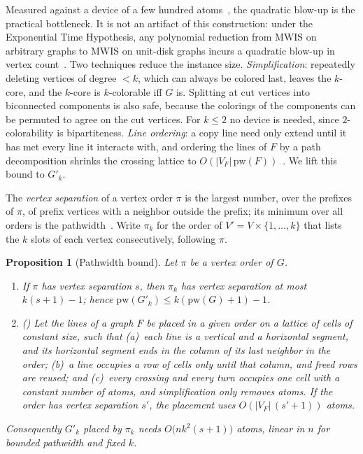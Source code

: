 \documentclass[a4paper,fleqn]{cas-sc}
\newtheorem{proposition}[theorem]{Proposition}
\begin{document}
Measured against a device of a few hundred atoms~\cite{Wurtz2023}, the quadratic
blow-up is the practical bottleneck. It is not an artifact of this construction: under
the Exponential Time Hypothesis, any polynomial reduction from MWIS on arbitrary graphs
to MWIS on unit-disk graphs incurs a quadratic blow-up in vertex
count~\cite{Cazals2025}. Two techniques reduce the instance size.
\emph{Simplification}: repeatedly deleting vertices of degree $<k$, which can always be
colored last, leaves the $k$-core, and the $k$-core is $k$-colorable iff $G$ is.
Splitting at cut vertices into biconnected components is also safe, because the
colorings of the components can be permuted to agree on the cut vertices. For $k\le2$
no device is needed, since $2$-colorability is bipartiteness. \emph{Line ordering}: a
copy line need only extend until it has met every line it interacts with, and ordering
the lines of $F$ by a path decomposition shrinks the crossing lattice to
$O(|V_F|\,\mathrm{pw}(F))$~\cite[App.~A]{Nguyen2023}. We lift this bound to $G'_k$.

The \emph{vertex separation} of a vertex order $\pi$ is the largest number, over the
prefixes of $\pi$, of prefix vertices with a neighbor outside the prefix; its minimum
over all orders is the pathwidth~\cite{Kinnersley1992}. Write $\pi_k$ for the order of
$V'=V\times\{1,\dots,k\}$ that lists the $k$ slots of each vertex consecutively,
following $\pi$.

\begin{proposition}[Pathwidth bound]
\label{prop:pathwidth}
Let $\pi$ be a vertex order of $G$.
\begin{enumerate}[label=(\roman*),leftmargin=2.2em]
  \item If $\pi$ has vertex separation $s$, then $\pi_k$ has vertex separation at
        most $k(s+1)-1$; hence $\mathrm{pw}(G'_k)\le k(\mathrm{pw}(G)+1)-1$.
  \item \textup{(\citealp[App.~A]{Nguyen2023})} Let the lines of a graph $F$ be
        placed in a given order on a lattice of cells of constant size, such that
        (a)~each line is a vertical and a horizontal segment, and its horizontal
        segment ends in the column of its last neighbor in the order; (b)~a line
        occupies a row of cells only until that column, and freed rows are
        reused; and (c)~every crossing and every turn occupies one cell with a
        constant number of atoms, and simplification only removes atoms. If the
        order has vertex separation $s'$, the placement uses
        $O(|V_F|\,(s'+1))$ atoms.
\end{enumerate}
\noindent Consequently $G'_k$ placed by $\pi_k$ needs $O\bigl(nk^2(s+1)\bigr)$ atoms, linear in $n$
for bounded pathwidth and fixed $k$.
\end{proposition}
\end{document}
